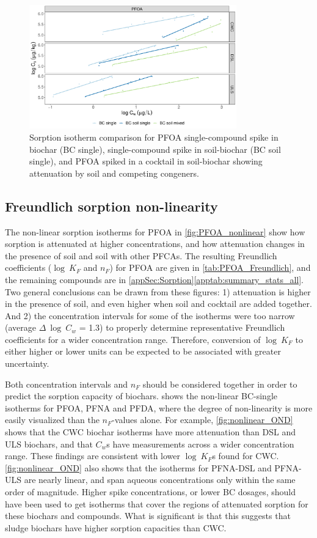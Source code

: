 \begin{figure}[htb]
    \centering
    \includegraphics[width=0.8\textwidth]{R/figs/Attenuation_isotherms_PFOA.pdf}
    \caption{Sorption isotherm comparison for PFOA single-compound spike in biochar (BC single), single-compound spike in soil-biochar (BC soil single), and PFOA spiked in a cocktail in soil-biochar showing attenuation by soil and competing congeners.}
    \label{fig:PFOA_attenuation}
\end{figure}

\subsection{Freundlich sorption non-linearity}\label{sec:non-linearity}
The non-linear sorption isotherms for PFOA in \cref{fig:PFOA_nonlinear} show how sorption is attenuated at higher concentrations, and how attenuation changes in the presence of soil and soil with other PFCAs. The resulting Freundlich coefficients ($\log~K_F$ and $n_F$) for PFOA are given in \cref{tab:PFOA_Freundlich}, and the remaining compounds are in \cref{appSec:Sorption}\cref{apptab:summary_stats_all}. Two general conclusions can be drawn from these figures: 1) attenuation is higher in the presence of soil, and even higher when soil and cocktail are added together. And 2) the concentration intervals for some of the isotherms were too narrow (average $\Delta~\log~C_w$ = 1.3) to properly determine representative Freundlich coefficients for a wider concentration range. Therefore, conversion of $\log~K_F$ to either higher or lower units can be expected to be associated with greater uncertainty.

Both concentration intervals and $n_F$ should be considered together in order to predict the sorption capacity of biochars.  shows the non-linear BC-single isotherms for PFOA, PFNA and PFDA, where the degree of non-linearity is more easily visualized than the $n_F$-values alone. For example, \cref{fig:nonlinear_OND} shows that the CWC biochar isotherms have more attenuation than DSL and ULS biochars, and that $C_w$s have measurements across a wider concentration range. These findings are consistent with lower $\log~K_F$s found for CWC. \cref{fig:nonlinear_OND} also shows that the isotherms for PFNA-DSL and PFNA-ULS are nearly linear, and span aqueous concentrations only within the same order of magnitude. Higher spike concentrations, or lower BC dosages, should have been used to get isotherms that cover the regions of attenuated sorption for these biochars and compounds. What is significant is that this suggests that sludge biochars have higher sorption capacities than CWC.

